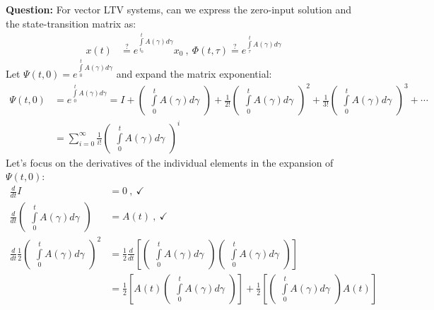 \documentclass[twoside]{article}
\begin{document}
\textbf{Question:} For vector LTV systems, can we express the zero-input solution and the state-transition matrix as:
%
\begin{align*}
x(t) &\overset{?}{=}  e^{ \int\limits_{t_0}^{t} A(\gamma) d\gamma  }  x_0 \ , \ \Phi(t,\tau) \overset{?}{=}  e^{ \int\limits_{\tau}^{t} A(\gamma) d\gamma  } 
\end{align*}
%
Let $\Psi(t,0) = e^{ \int\limits_{0}^{t} A(\gamma) d\gamma  } $ and expand the matrix exponential:
%
\begin{align*}
\Psi(t,0) &= e^{ \int\limits_{0}^{t} A(\gamma) d\gamma }  = I + \begin{pmatrix} \int\limits_{0}^{t} A(\gamma) d\gamma \end{pmatrix} + \frac{1}{2 !} \begin{pmatrix} \int\limits_{0}^{t} A(\gamma) d\gamma \end{pmatrix}^2  
+ \frac{1}{3 !} \begin{pmatrix} \int\limits_{0}^{t} A(\gamma) d\gamma \end{pmatrix}^3  + \cdots 
\\ 
&= \sum\limits_{i=0}^{\infty} \frac{1}{i !} \begin{pmatrix} \int\limits_{0}^{t} A(\gamma) d\gamma \end{pmatrix}^i  
\end{align*}
%
Let's focus on the derivatives of the individual elements in the expansion of $\Psi(t,0)$:
%
\begin{align*}
\frac{d}{dt} I &= 0 \ , \ \checkmark
\\
\frac{d}{dt}  \begin{pmatrix} \int\limits_{0}^{t} A(\gamma) d\gamma \end{pmatrix} &= A(t) \ , \ \checkmark
\\
\frac{d}{dt} \frac{1}{2}  \begin{pmatrix} \int\limits_{0}^{t} A(\gamma) d\gamma \end{pmatrix}^2 &= \frac{1}{2} \frac{d}{dt} \left[  \begin{pmatrix} \int\limits_{0}^{t} A(\gamma) d\gamma \end{pmatrix}  \begin{pmatrix} \int\limits_{0}^{t} A(\gamma) d\gamma \end{pmatrix} \right] \\
&= \frac{1}{2} \left[ A(t) \begin{pmatrix} \int\limits_{0}^{t} A(\gamma) d\gamma \end{pmatrix} \right] 
+  \frac{1}{2} \left[ \begin{pmatrix} \int\limits_{0}^{t} A(\gamma) d\gamma \end{pmatrix} A(t) \right] 
\end{align*}
\end{document}
